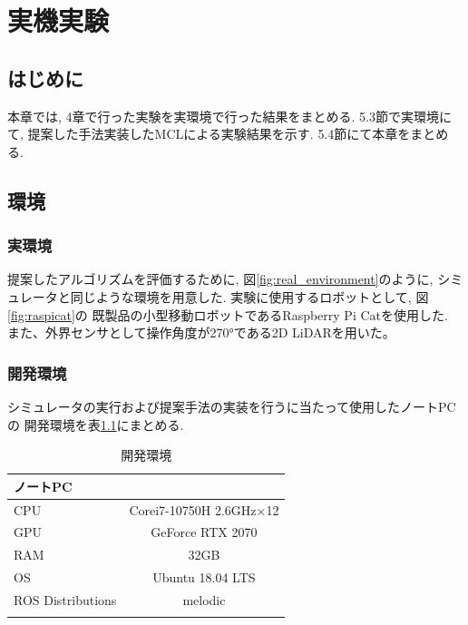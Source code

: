 \chapter{実機実験}\label{chap:practical_experiment}

\section{はじめに}
本章では, 4章で行った実験を実環境で行った結果をまとめる. 
5.3節で実環境にて, 提案した手法実装したMCLによる実験結果を示す. 
5.4節にて本章をまとめる.

\section{環境}

\subsection{実環境}

提案したアルゴリズムを評価するために, 図\ref{fig:real_environment}のように, 
シミュレータと同じような環境を用意した. 実験に使用するロボットとして, 図\ref{fig:raspicat}の
既製品の小型移動ロボットであるRaspberry Pi Catを使用した. 
また、外界センサとして操作角度が270°である2D LiDARを用いた。

\subsection{開発環境}

シミュレータの実行および提案手法の実装を行うに当たって使用したノートPCの
開発環境を表\ref{tabule:pc_spec_real}にまとめる. 

\begin{table}[ht]
  \caption{開発環境}
  \label{tabule:pc_spec_real}
  \begin{center}
    \begin{tabular}{l|c} 
      \thline
      ノートPC & \\
      \hline
      CPU & Corei7-10750H 2.6GHz×12 \\
      GPU & GeForce RTX 2070 \\
      RAM & 32GB \\
      OS & Ubuntu 18.04 LTS \\
      ROS Distributions & melodic \\ 
      \thline
    \end{tabular}
  \end{center}
\end{table}


